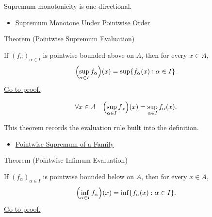 \begin{remark*}[Interpretation]
Supremum monotonicity is one-directional.
\end{remark*}

\begin{dependencies}
\begin{itemize}
  \item \hyperref[thm:supremum-monotone-under-pointwise-order]{Supremum Monotone Under Pointwise Order}
\end{itemize}
\end{dependencies}

\begin{theorembox}{Theorem (Pointwise Supremum Evaluation)}
\begin{theorem}
\label{thm:pointwise-supremum-evaluation}
If \((f_\alpha)_{\alpha\in I}\) is pointwise bounded above on \(A\), then
for every \(x\in A\),
\[
  \Bigl(\sup_{\alpha\in I}f_\alpha\Bigr)(x)
  =
  \sup\{f_\alpha(x):\alpha\in I\}.
\]
\hyperref[prf:pointwise-supremum-evaluation]{Go to proof.}
\end{theorem}
\end{theorembox}

\begin{remark*}
\[
  \forall x\in A\quad
  \Bigl(\sup_{\alpha\in I}f_\alpha\Bigr)(x)
  =
  \sup_{\alpha\in I}f_\alpha(x).
\]
\end{remark*}

\begin{remark*}[Interpretation]
This theorem records the evaluation rule built into the definition.
\end{remark*}

\begin{dependencies}
\begin{itemize}
  \item \hyperref[def:pointwise-supremum-family]{Pointwise Supremum of a Family}
\end{itemize}
\end{dependencies}

\begin{theorembox}{Theorem (Pointwise Infimum Evaluation)}
\begin{theorem}
\label{thm:pointwise-infimum-evaluation}
If \((f_\alpha)_{\alpha\in I}\) is pointwise bounded below on \(A\), then
for every \(x\in A\),
\[
  \Bigl(\inf_{\alpha\in I}f_\alpha\Bigr)(x)
  =
  \inf\{f_\alpha(x):\alpha\in I\}.
\]
\hyperref[prf:pointwise-infimum-evaluation]{Go to proof.}
\end{theorem}
\end{theorembox}

